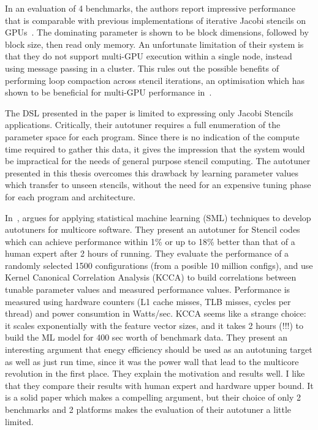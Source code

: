 In an evaluation of 4 benchmarks, the authors report impressive
performance that is comparable with previous implementations of
iterative Jacobi stencils on
GPUs~\cite{Holewinski2012,Phillips2010}. The dominating parameter is
shown to be block dimensions, followed by block size, then read only
memory. An unfortunate limitation of their system is that they do not
support multi-GPU execution within a single node, instead using
message passing in a cluster. This rules out the possible benefits of
performing loop compaction across stencil iterations, an optimisation
which has shown to be beneficial for multi-GPU performance
in~\cite{Lutz2013}.

The DSL presented in the paper is limited to expressing only Jacobi
Stencils applications. Critically, their autotuner requires a full
enumeration of the parameter space for each program. Since there is no
indication of the compute time required to gather this data, it gives
the impression that the system would be impractical for the needs of
general purpose stencil computing. The autotuner presented in this
thesis overcomes this drawback by learning parameter values which
transfer to unseen stencils, without the need for an expensive tuning
phase for each program and architecture.


In~\cite{Ganapathi2009}, \citeauthor{Ganapathi2009} argues for
applying statistical machine learning (SML) techniques to develop
autotuners for multicore software. They present an autotuner for
Stencil codes which can achieve performance within 1\% or up to 18\%
better than that of a human expert after 2 hours of running. They
evaluate the performance of a randomly selected 1500 configurations
(from a posible 10 million configs), and use Kernel Canonical
Correlation Analysis (KCCA) to build correlations between tunable
parameter values and measured performance values. Performance is
measured using hardware counters (L1 cache misses, TLB misses, cycles
per thread) and power consumtion in Watts/sec. KCCA seems like a
strange choice: it scales exponentially with the feature vector sizes,
and it takes 2 hours (!!!) to build the ML model for 400 sec worth of
benchmark data. They present an interesting argument that enegy
efficiency should be used as an autotuning target as well as just run
time, since it was the power wall that lead to the multicore
revolution in the first place. They explain the motivation and results
well. I like that they compare their results with human expert and
hardware upper bound. It is a solid paper which makes a compelling
argument, but their choice of only 2 benchmarks and 2 platforms makes
the evaluation of their autotuner a little limited.

